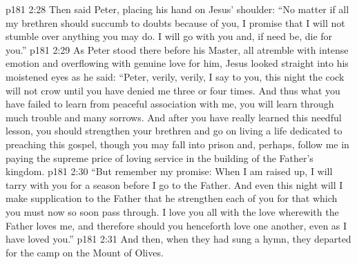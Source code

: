 \vs p181 2:28 Then said Peter, placing his hand on Jesus’ shoulder: “No matter if all my brethren should succumb to doubts because of you, I promise that I will not stumble over anything you may do. I will go with you and, if need be, die for you.”
\vs p181 2:29 As Peter stood there before his Master, all atremble with intense emotion and overflowing with genuine love for him, Jesus looked straight into his moistened eyes as he said: \textcolor{ubdarkred}{“Peter, verily, verily, I say to you, this night the cock will not crow until you have denied me three or four times. And thus what you have failed to learn from peaceful association with me, you will learn through much trouble and many sorrows. And after you have really learned this needful lesson, you should strengthen your brethren and go on living a life dedicated to preaching this gospel, though you may fall into prison and, perhaps, follow me in paying the supreme price of loving service in the building of the Father’s kingdom.}
\vs p181 2:30 \textcolor{ubdarkred}{“But remember my promise: When I am raised up, I will tarry with you for a season before I go to the Father. And even this night will I make supplication to the Father that he strengthen each of you for that which you must now so soon pass through. I love you all with the love wherewith the Father loves me, and therefore should you henceforth love one another, even as I have loved you.”}
\pc \vs p181 2:31 And then, when they had sung a hymn, they departed for the camp on the Mount of Olives.
